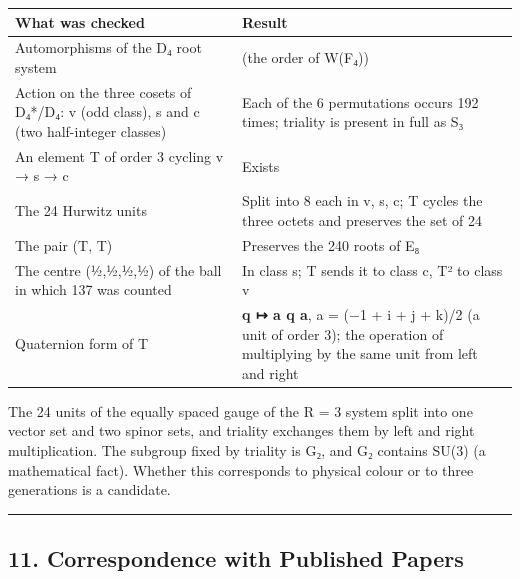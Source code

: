 \documentclass[
  a4paper,
]{article}
\newcounter{none} %
\begin{document}
{\def\LTcaptype{none} %
\begin{longtable}[]{@{}
  >{\raggedright\arraybackslash}p{}
  >{\raggedright\arraybackslash}p{}@{}}
\toprule\noalign{}
\begin{minipage}[b]{\linewidth}\raggedright
What was checked
\end{minipage} & \begin{minipage}[b]{\linewidth}\raggedright
Result
\end{minipage} \\
\midrule\noalign{}
\endhead
\bottomrule\noalign{}
\endlastfoot
Automorphisms of the D₄ root system & 1152 (the order of W(F₄)) \\
Action on the three cosets of D₄*/D₄: v (odd class), s and c (two
half-integer classes) & Each of the 6 permutations occurs 192 times;
triality is present in full as S₃ \\
An element T of order 3 cycling v → s → c & Exists \\
The 24 Hurwitz units & Split into 8 each in v, s, c; T cycles the three
octets and preserves the set of 24 \\
The pair (T, T) & Preserves the 240 roots of E₈ \\
The centre (½,½,½,½) of the ball in which 137 was counted & In class s;
T sends it to class c, T² to class v \\
Quaternion form of T & \textbf{q ↦ a q a}, a = (−1 + i + j + k)/2 (a
unit of order 3); the operation of multiplying by the same unit from
left and right \\
\end{longtable}
}

The 24 units of the equally spaced gauge of the R = 3 system split into
one vector set and two spinor sets, and triality exchanges them by left
and right multiplication. The subgroup fixed by triality is G₂, and G₂
contains SU(3) (a mathematical fact). Whether this corresponds to
physical colour or to three generations is a candidate.

\begin{center}\rule{0.5\linewidth}{0.5pt}\end{center}

\subsection{11. Correspondence with Published
Papers}\label{correspondence-with-published-papers}
\end{document}
